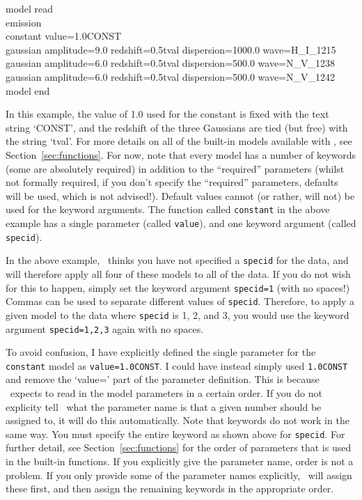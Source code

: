 \vspace{0.3cm}
\begin{mdframed}[style=MyFrame]
model read\\
emission\\
constant value=1.0CONST\\
gaussian amplitude=9.0 redshift=0.5tval dispersion=1000.0 wave=H\_I\_1215\\
gaussian amplitude=6.0 redshift=0.5tval dispersion=500.0 wave=N\_V\_1238\\
gaussian amplitude=6.0 redshift=0.5tval dispersion=500.0 wave=N\_V\_1242\\
model end
\end{mdframed}
\vspace{0.2cm}

In this example, the value of 1.0 used for the constant is fixed with
the text string `CONST', and the redshift of the three Gaussians are
tied (but free) with the string `tval'. For more details on all of the
built-in models available with \alis, see Section~\ref{sec:functions}. For now,
note that every model has a number of keywords (some are absolutely
required) in addition to the ``required'' parameters (whilst not formally
required, if you don't specify the ``required'' parameters, defaults will
be used, which is not advised!). Default values cannot (or rather, will not)
be used for the keyword arguments. The function called \texttt{constant}
in the above example has a single parameter (called \texttt{value}),
and one keyword argument (called \texttt{specid}).

In the above example, \alis\ thinks you have not specified a
\texttt{specid} for the data, and will therefore apply all four of
these models to all of the data. If you do not wish for this to
happen, simply set the keyword argument \texttt{specid=1}
(with no spaces!) Commas can be used to separate different
values of \texttt{specid}. Therefore, to apply a given model to
the data where \texttt{specid} is 1, 2, and 3, you would use the
keyword argument \texttt{specid=1,2,3} again with no spaces.

To avoid confusion, I have explicitly defined the single parameter
for the \texttt{constant} model as \texttt{value=1.0CONST}. I could
have instead simply used \texttt{1.0CONST} and remove the
`value=' part of the parameter definition. This is because \alis\
expects to read in the model parameters in a certain order. If you
do not explicity tell \alis\ what the parameter name is that a given
number should be assigned to, it will do this automatically. Note
that keywords do not work in the same way. You must specify the
entire keyword as shown above for \texttt{specid}. For further
detail, see Section~\ref{sec:functions} for the order of parameters that is
used in the built-in functions. If you explicitly give the parameter
name, order is not a problem. If you only provide some of the
parameter names explicitly, \alis\ will assign these first, and then
assign the remaining keywords in the appropriate order.

